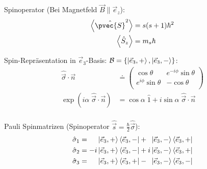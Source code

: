 \documentclass[11pt]{article}
\numberwithin{equation}{section}
\begin{document}
      Spinoperator (Bei Magnetfeld $\vec{B}\parallel\vec{e}_z$):
      \begin{equation}
        \begin{aligned}
          \left<\hat{\pvec{S}}^2\right> &= s(s+1)\hbar^2 \\
          \left<\hat{S}_z\right> &= m_s \hbar \\
        \end{aligned}
      \end{equation}

      Spin-Repräsentation in $\vec{e}_3$-Basis: $\mathcal{B} = \{ \Ket{\vec{e}_3,+}, \Ket{\vec{e}_3,-} \}$:
      \begin{equation}
        \begin{aligned}
          \hat{\vec{\sigma}} \cdot \vec{n} &\doteq
          \left( \begin{matrix}
            \cos\theta & e^{-i\phi}\sin\theta \\
            e^{i\phi}\sin\theta & -\cos\theta \\
          \end{matrix} \right) \\
          \exp\left( i\alpha \; \hat{\vec{\sigma}} \cdot \vec{n} \right) &= \cos\alpha \;\hat{1} + i\sin\alpha \; \hat{\vec{\sigma}} \cdot \vec{n} \\
        \end{aligned}
      \end{equation}

      Pauli Spinmatrizen (Spinoperator $\hat{\vec{s}} = \frac{\hbar}{2} \hat{\vec{\sigma}}$):
      \begin{equation}
        \begin{aligned}
          \hat{\sigma}_1 &= \phantom{-i}\Ket{\vec{e}_3,+} \Bra{\vec{e}_3,-} + \phantom{i}\Ket{\vec{e}_3,-} \Bra{\vec{e}_3,+} \\
          \hat{\sigma}_2 &= -i\Ket{\vec{e}_3,+} \Bra{\vec{e}_3,-} + i\Ket{\vec{e}_3,-} \Bra{\vec{e}_3,+} \\
          \hat{\sigma}_3 &= \phantom{-i}\Ket{\vec{e}_3,+} \Bra{\vec{e}_3,+} - \phantom{i}\Ket{\vec{e}_3,-} \Bra{\vec{e}_3,-} \\
        \end{aligned}
      \end{equation}
\end{document}
